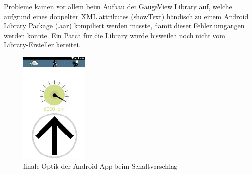 Probleme kamen vor allem beim Aufbau der GaugeView Library auf, welche aufgrund eines doppelten XML attributes (showText) händisch zu einem Android Library Package (.aar) kompiliert werden musste, damit dieser Fehler umgangen werden konnte. Ein Patch für die Library wurde bisweilen noch nicht vom Library-Ersteller bereitet. 



\begin{figure}[!htb]\centering
		\includegraphics[width=0.3\textwidth]{images/schalt}
		\caption{finale Optik der Android App beim Schaltvorschlag} \label{fig:imgShiftAndroidFinished}
\end{figure}


\clearpage %
